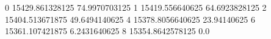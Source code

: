 0 15429.861328125 74.9970703125
1 15419.556640625 64.6923828125
2 15404.513671875 49.6494140625
4 15378.8056640625 23.94140625
6 15361.107421875 6.2431640625
8 15354.8642578125 0.0
